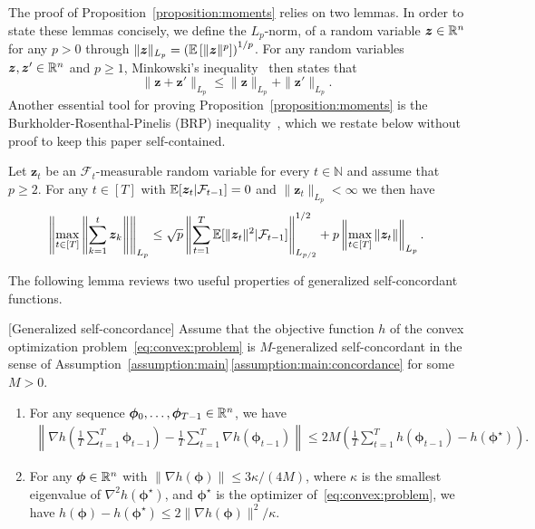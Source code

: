 \documentclass[11pt, a4paper, oneside, reqno]{article}
\begin{document}
	The proof of Proposition~\ref{proposition:moments} relies on two lemmas. In order to state these lemmas concisely, we define the $L_p$-norm, of a random variable $\bm z \in \mathbb{R}^n$ for any $p > 0$ through $\| \bm z \|_{L_p} = \left( \mathbb{E} \left[ \| \bm z \|^p \right] \right)^{1/p}$. For any random variables $\bm z, \bm z' \in \mathbb{R}^n$ and $p \geq 1$, Minkowski's inequality~\citep[\S~2.11]{boucheron2013concentration} then states that
	\begin{equation}
	    \label{eq:minkowski}
	    \| \bm z + \bm z' \|_{L_p} \leq \| \bm z \|_{L_p} + \| \bm z' \|_{L_p}.
	\end{equation}
	Another essential tool for proving Proposition~\ref{proposition:moments} is the Burkholder-Rosenthal-Pinelis (BRP) inequality~\citep[Theorem~4.1]{pinelis1994optimum}, which we restate below without proof to keep this paper self-contained.
	
	\begin{lemma}
		\label{lemma:BRP}
		Let $\bm z_t$ be an $\mathcal F_t$-measurable random variable for every $t\in\mathbb N$ and assume that $p \geq 2$. For any $t \in [T]$ with $\mathbb{E}[\bm z_t | \mathcal F_{t-1}] = 0 $ and $\| \bm z_t \|_{L_p}<\infty$ we then have
		\begin{align*}
		    \left\| \max_{t \in [T]} \left\| \sum_{k=1}^t \bm z_k \right\| \right\|_{L_p}
		    \leq \sqrt{p} \left\| \sum_{t=1}^T \mathbb{E}[ \| \bm z_t \|^2 | \mathcal F_{t-1}] \right\|_{L_{p/2}}^{1/2} + p \left\| \max_{t \in [T]} \| \bm z_t \| \right\|_{L_p}. 
		\end{align*}
	\end{lemma}
	The following lemma reviews two useful properties of generalized self-concordant functions.
	\begin{lemma} \label{lemma:concordance} [Generalized self-concordance]
		Assume that the objective function
		$h$ of the convex optimization problem~\eqref{eq:convex:problem} is $M$-generalized self-concordant in the sense of Assumption~\ref{assumption:main}\,\ref{assumption:main:concordance} for some $M>0$.
		\begin{enumerate} [label=(\roman*)]
			\item
			\label{lemma:smoothness}
			{\citep[Appendix~D.2]{bach2013adaptivity}} For any sequence $\bm \phi_0, \dots, \bm \phi_{T-1} \in \mathbb{R}^n$, we have
			\begin{align*}
			\left\| \nabla h \left( \frac{1}{T} \sum_{t=1}^T \bm \phi_{t-1} \right) - \frac{1}{T} \sum_{t=1}^T \nabla h(\bm \phi_{t-1}) \right\| \leq 2 M \left( \frac{1}{T} \sum_{t=1}^T h(\bm \phi_{t-1}) - h(\bm \phi^\star) \right).
			\end{align*}
			
			\item
			\label{lemma:stong:convexity}
			{\citep[Lemma~9]{bach2013adaptivity}}
			For any $\bm \phi \in \mathbb{R}^n$ with $ \| \nabla h(\bm \phi) \| \leq 3 \kappa / (4 M) $, where $\kappa$ is the smallest eigenvalue of $\nabla^2 h(\bm \phi^\star)$, and $\bm \phi^\star$ is the optimizer of~\eqref{eq:convex:problem}, we have
			$ h(\bm \phi) - h(\bm \phi^\star) \leq 2 {\| \nabla h(\bm \phi) \|^2}/{\kappa}.$
		\end{enumerate}
	\end{lemma}
	
\end{document}
